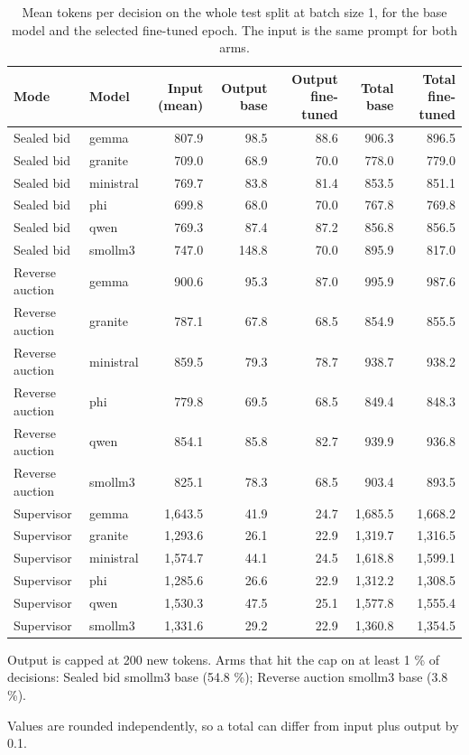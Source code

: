 \begin{table}[t]
\centering
\small
\caption{Mean tokens per decision on the whole test split at batch size 1, for the base model and the selected fine-tuned epoch. The input is the same prompt for both arms.}
\label{tab:tokens_summary}
\begin{tabular}{llrrrrr}
\toprule
Mode & Model & Input (mean) & Output base & Output fine-tuned & Total base & Total fine-tuned \\
\midrule
Sealed bid & gemma & 807.9 & 98.5 & 88.6 & 906.3 & 896.5 \\
Sealed bid & granite & 709.0 & 68.9 & 70.0 & 778.0 & 779.0 \\
Sealed bid & ministral & 769.7 & 83.8 & 81.4 & 853.5 & 851.1 \\
Sealed bid & phi & 699.8 & 68.0 & 70.0 & 767.8 & 769.8 \\
Sealed bid & qwen & 769.3 & 87.4 & 87.2 & 856.8 & 856.5 \\
Sealed bid & smollm3 & 747.0 & 148.8 & 70.0 & 895.9 & 817.0 \\
Reverse auction & gemma & 900.6 & 95.3 & 87.0 & 995.9 & 987.6 \\
Reverse auction & granite & 787.1 & 67.8 & 68.5 & 854.9 & 855.5 \\
Reverse auction & ministral & 859.5 & 79.3 & 78.7 & 938.7 & 938.2 \\
Reverse auction & phi & 779.8 & 69.5 & 68.5 & 849.4 & 848.3 \\
Reverse auction & qwen & 854.1 & 85.8 & 82.7 & 939.9 & 936.8 \\
Reverse auction & smollm3 & 825.1 & 78.3 & 68.5 & 903.4 & 893.5 \\
Supervisor & gemma & 1,643.5 & 41.9 & 24.7 & 1,685.5 & 1,668.2 \\
Supervisor & granite & 1,293.6 & 26.1 & 22.9 & 1,319.7 & 1,316.5 \\
Supervisor & ministral & 1,574.7 & 44.1 & 24.5 & 1,618.8 & 1,599.1 \\
Supervisor & phi & 1,285.6 & 26.6 & 22.9 & 1,312.2 & 1,308.5 \\
Supervisor & qwen & 1,530.3 & 47.5 & 25.1 & 1,577.8 & 1,555.4 \\
Supervisor & smollm3 & 1,331.6 & 29.2 & 22.9 & 1,360.8 & 1,354.5 \\
\bottomrule
\end{tabular}
\par\smallskip
{\footnotesize Output is capped at 200 new tokens. Arms that hit the cap on at least 1 \% of decisions: Sealed bid smollm3 base (54.8 \%); Reverse auction smollm3 base (3.8 \%).\par Values are rounded independently, so a total can differ from input plus output by 0.1.\par}
\end{table}
